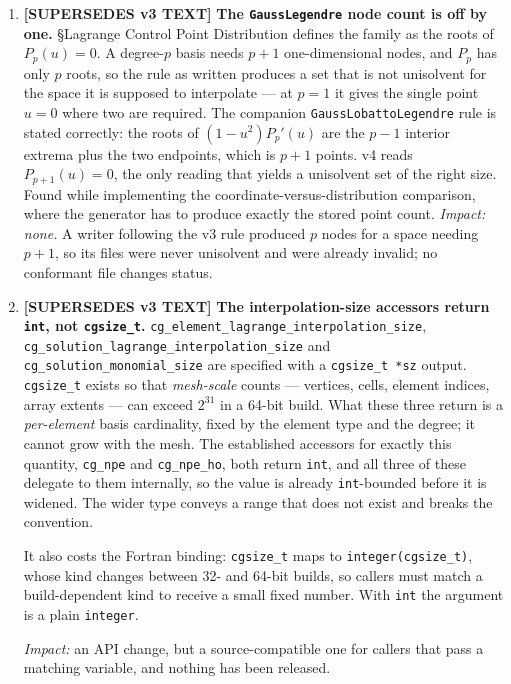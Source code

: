 \documentclass[11pt,letterpaper]{article}
\newif\ifvfourdraft
\newenvironment{v4block}{\ifvfourdraft\color{v4violet}\fi\ignorespaces}{\par}
\newcommand{\SUPERSEDESIV}{\ifvfourdraft
  \textcolor{v4violet}{\textbf{[SUPERSEDES v3 TEXT]}}\else
  \textcolor{clarifybrown}{\textbf{[SUPERSEDES v3 TEXT]}}\fi}
\begin{document}
{\begin{v4block}
\begin{enumerate}[leftmargin=1.4em,itemsep=0.5em]
  \item \SUPERSEDESIV{} \textbf{The \texttt{GaussLegendre} node count is off by
    one.}  \S Lagrange Control Point Distribution defines the family as the roots
    of $P_p(u)=0$.  A degree-$p$ basis needs $p+1$ one-dimensional nodes, and
    $P_p$ has only $p$ roots, so the rule as written produces a set that is not
    unisolvent for the space it is supposed to interpolate --- at $p=1$ it gives
    the single point $u=0$ where two are required.  The companion
    \texttt{GaussLobattoLegendre} rule is stated correctly: the roots of
    $(1-u^2)P_p'(u)$ are the $p-1$ interior extrema plus the two endpoints,
    which is $p+1$ points.  v4 reads $P_{p+1}(u)=0$, the only reading that
    yields a unisolvent set of the right size.  Found while implementing the
    coordinate-versus-distribution comparison, where the generator has to produce
    exactly the stored point count.
    \textit{Impact: none.}  A writer following the v3 rule produced $p$ nodes for a
    space needing $p+1$, so its files were never unisolvent and were already
    invalid; no conformant file changes status.

  \item \SUPERSEDESIV{} \textbf{The interpolation-size accessors return
    \texttt{int}, not \texttt{cgsize\_t}.}
    \texttt{cg\_element\_lagrange\_interpolation\_size},
    \texttt{cg\_solution\_lagrange\_interpolation\_size} and
    \texttt{cg\_solution\_monomial\_size} are specified with a
    \texttt{cgsize\_t *sz} output.  \texttt{cgsize\_t} exists so that
    \emph{mesh-scale} counts --- vertices, cells, element indices, array extents
    --- can exceed $2^{31}$ in a 64-bit build.  What these three return is a
    \emph{per-element} basis cardinality, fixed by the element type and the
    degree; it cannot grow with the mesh.  The established accessors for exactly
    this quantity, \texttt{cg\_npe} and \texttt{cg\_npe\_ho}, both return
    \texttt{int}, and all three of these delegate to them internally, so the
    value is already \texttt{int}-bounded before it is widened.  The wider type
    conveys a range that does not exist and breaks the convention.

    It also costs the Fortran binding: \texttt{cgsize\_t} maps to
    \texttt{integer(cgsize\_t)}, whose kind changes between 32- and 64-bit
    builds, so callers must match a build-dependent kind to receive a small
    fixed number.  With \texttt{int} the argument is a plain \texttt{integer}.

    \textit{Impact:} an API change, but a source-compatible one for callers that
    pass a matching variable, and nothing has been released.


\end{enumerate}
\end{v4block}}
\end{document}
